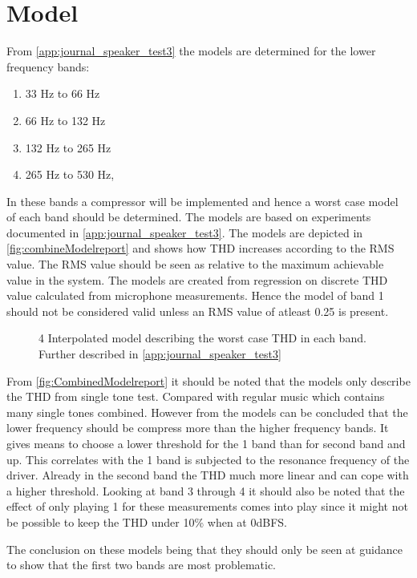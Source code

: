 \section{Model}

From \autoref{app:journal_speaker_test3} the models are determined for the lower frequency bands:
\begin{enumerate}
\item 33 Hz to 66 Hz
\item 66 Hz to 132 Hz
\item 132 Hz to 265 Hz
\item 265 Hz to 530 Hz,
\end{enumerate}
In these bands a compressor will be implemented and hence a worst case model of each band should be determined. The models are based on experiments documented in \autoref{app:journal_speaker_test3}. The models are depicted in \autoref{fig:combineModelreport} and shows how THD increases according to the RMS value. The RMS value should be seen as relative to the maximum achievable value in the system. The models are created from regression on discrete THD value calculated from microphone measurements. Hence the model of band 1 should not be considered valid unless an RMS value of atleast 0.25 is present.

\begin{figure}[H]
    \centering
    
    \caption{4 Interpolated model describing the worst case THD in each band. Further described in \autoref{app:journal_speaker_test3}}
    \label{fig:CombinedModelreport}
\end{figure}

From \autoref{fig:CombinedModelreport} it should be noted that the models only describe the THD from single tone test. Compared with regular music which contains many single tones combined. However from the models can be concluded that the lower frequency should be compress more than the higher frequency bands. It gives means to choose a lower threshold for the 1 band than for second band and up. This correlates with the 1 band is subjected to the resonance frequency of the driver. Already in the second band the THD much more linear and can cope with a higher threshold. Looking at band 3 through 4 it should also be noted that the effect of only playing 1 for these measurements comes into play since it might not be possible to keep the THD under 10\% when at 0dBFS. 

The conclusion on these models being that they should only be seen at guidance to show that the first two bands are most problematic.
